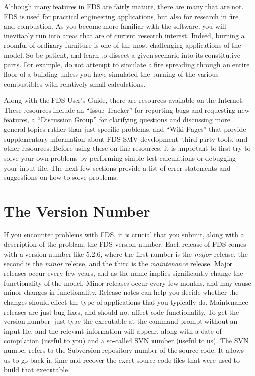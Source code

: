 \documentclass[11pt]{book}
\begin{document}
Although many features in FDS are fairly mature, there are many that are not. FDS is used for
practical engineering applications, but also for research in fire and combustion. As you become
more familiar with the software, you will inevitably run into areas that are of current research
interest. Indeed, burning a roomful of ordinary furniture is one of the most challenging applications
of the model. So be patient, and learn to dissect a given scenario into its constitutive parts.
For example, do not attempt to simulate a fire spreading through an entire floor of a
building unless you have simulated the burning of the various combustibles with relatively small calculations.

Along with the FDS User's Guide, there are resources available on the Internet.
These resources include an ``Issue Tracker'' for reporting bugs and requesting new features,
a ``Discussion Group'' for clarifying questions and discussing more general
topics rather than just specific problems, and ``Wiki Pages'' that provide supplementary information
about FDS-SMV development, third-party tools, and other resources.
Before using these on-line resources, it is important to first try to solve your own
problems by performing simple test calculations or debugging your input file. The next few sections
provide a list of error statements and suggestions on how to solve problems.

\section{The Version Number}

If you encounter problems with FDS, it is crucial that you submit, along with a description of the problem, the FDS version number. Each release of
FDS comes with a version number like 5.2.6, where the first number is the {\em major} release, the second is the {\em minor} release, and the
third is the {\em maintenance} release. Major releases occur every few years, and as the name implies significantly change the functionality of the model.
Minor releases occur every few months, and may cause minor changes in functionality. Release notes can help you decide whether the changes should effect the
type of applications that you typically do. Maintenance releases are just bug fixes, and should not affect code functionality. To get the version number, just
type the executable at the command prompt without an input file, and the relevant information will appear,
along with a date of compilation (useful to you) and a so-called SVN number (useful to us).  The SVN number refers to
the Subversion repository number of the source code. It allows us to go back in time and recover the exact source code files
that were used to build that executable.
\end{document}
